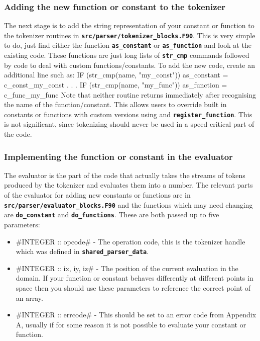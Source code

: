 \documentclass[12pt,a4paper]{article}
\newcommand{\inlinecode}[1]{{\color{warwickred} \bf\texttt{#1}}}
\newenvironment{boxverbatim}{\lboxverbatim{none}}{\endlboxverbatim}
\begin{document}
\subsubsection{Adding the new function or constant to the tokenizer}
The next stage is to add the string representation of your constant or function
to the tokenizer routines in
\inlinecode{src/parser/tokenizer\_blocks.F90}. This is very simple to do, just
find either the function \inlinecode{as\_constant} or \inlinecode{as\_function}
and look at the existing code. These functions are just long lists of
\inlinecode{str\_cmp} commands followed by code to deal with custom
functions/constants. To add the new code, create an additional line such as:
\begin{boxverbatim}
  IF (str_cmp(name, "my_const")) as_constant = c_const_my_const
  .
  .
  .
  IF (str_cmp(name, "my_func"))  as_function = c_func_my_func
\end{boxverbatim}
Note that neither routine returns immediately after recognising the name of the
function/constant. This allows users to override built in constants or
functions with custom versions using\linebreak \inlinecode{register\_constant} and
\inlinecode{register\_function}. This is not significant, since tokenizing
should never be used in a speed critical part of the code.

\subsubsection{Implementing the function or constant in the evaluator}
The evaluator is the part of the code that actually takes the streams of tokens
produced by the tokenizer and evaluates them into a number. The relevant parts
of the evaluator for adding new constants or functions are in
\inlinecode{src/parser/evaluator\_blocks.F90} and the functions which may need
changing are \inlinecode{do\_constant} and \inlinecode{do\_functions}. These are
both passed up to five parameters:
\begin{itemize}
\item #INTEGER :: opcode# - The operation code, this is the tokenizer handle
  which was defined in \inlinecode{shared\_parser\_data}.
\item #INTEGER :: ix, iy, iz# - The position of the current evaluation in the
  domain. If your function or constant behaves differently at different points
  in space then you should use these parameters to reference the correct point
  of an array.
\item #INTEGER :: errcode# - This should be set to an error code from
  Appendix A, usually\linebreak \inlinecode{c\_err\_bad\_value} if for some
  reason it is not possible to evaluate your constant or function.
\end{itemize}
\end{document}
